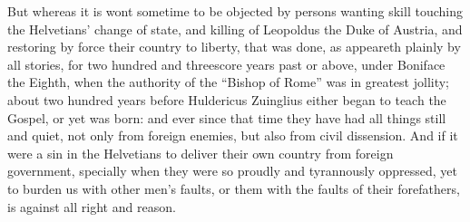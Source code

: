 But whereas it is wont sometime to be objected by persons wanting
skill touching the Helvetians’ change of state, and killing of
Leopoldus the Duke of Austria, and restoring by force their country
to liberty, that was done, as appeareth plainly by all stories, for
two hundred and threescore years past or
above, under Boniface the Eighth, when the authority of the “Bishop
of Rome” was in greatest jollity; about two hundred years before
Huldericus Zuinglius either began to teach the Gospel, or yet was born:
and ever since that time they have had all things still and quiet, not
only from foreign enemies, but also from civil dissension. And
if it were a sin in the Helvetians to deliver their own country from
foreign government, specially when they were so proudly and tyrannously
oppressed, yet to burden us with other men’s faults, or them with
the faults of their forefathers, is against all right and reason.

